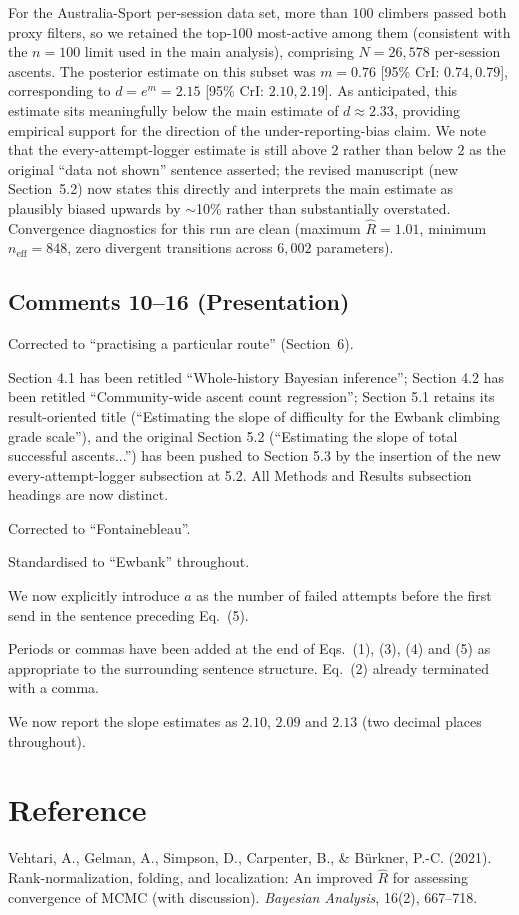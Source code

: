 \documentclass[11pt]{article}
\begin{document}
For the Australia-Sport per-session data set, more than $100$ climbers passed both proxy filters, so we retained the top-$100$ most-active among them (consistent with the $n=100$ limit used in the main analysis), comprising $N = 26{,}578$ per-session ascents. The posterior estimate on this subset was $m = 0.76$ [95\% CrI: $0.74, 0.79$], corresponding to $d = e^m = 2.15$ [95\% CrI: $2.10, 2.19$]. As anticipated, this estimate sits meaningfully below the main estimate of $d \approx 2.33$, providing empirical support for the direction of the under-reporting-bias claim. We note that the every-attempt-logger estimate is still above $2$ rather than below $2$ as the original ``data not shown'' sentence asserted; the revised manuscript (new Section~5.2) now states this directly and interprets the main estimate as plausibly biased upwards by $\sim$10\% rather than substantially overstated. Convergence diagnostics for this run are clean (maximum $\hat{R} = 1.01$, minimum $n_{\mathrm{eff}} = 848$, zero divergent transitions across $6{,}002$ parameters).

\subsection*{Comments 10--16 (Presentation)}

\begin{description}[leftmargin=2em,style=nextline]
\item[\#10 ``practising a particle route''] Corrected to ``practising a particular route'' (Section~6).
\item[\#11 Section 5.1 reuses Section 4.1 heading] Section 4.1 has been retitled ``Whole-history Bayesian inference''; Section 4.2 has been retitled ``Community-wide ascent count regression''; Section 5.1 retains its result-oriented title (``Estimating the slope of difficulty for the Ewbank climbing grade scale''), and the original Section 5.2 (``Estimating the slope of total successful ascents...'') has been pushed to Section 5.3 by the insertion of the new every-attempt-logger subsection at 5.2. All Methods and Results subsection headings are now distinct.
\item[\#12 ``Fontainbleau''] Corrected to ``Fontainebleau''.
\item[\#13 ``Ewbanks''] Standardised to ``Ewbank'' throughout.
\item[\#14 Variable $a$ in Eq.~(5)] We now explicitly introduce $a$ as the number of failed attempts before the first send in the sentence preceding Eq.~(5).
\item[\#15 Punctuation after equations] Periods or commas have been added at the end of Eqs.~(1), (3), (4) and (5) as appropriate to the surrounding sentence structure. Eq.~(2) already terminated with a comma.
\item[\#16 Decimal precision in abstract] We now report the slope estimates as $2.10$, $2.09$ and $2.13$ (two decimal places throughout).
\end{description}

\section*{Reference}

\noindent Vehtari, A., Gelman, A., Simpson, D., Carpenter, B., \& B\"urkner, P.-C. (2021). Rank-normalization, folding, and localization: An improved $\hat{R}$ for assessing convergence of MCMC (with discussion). \emph{Bayesian Analysis}, 16(2), 667--718.
\end{document}
